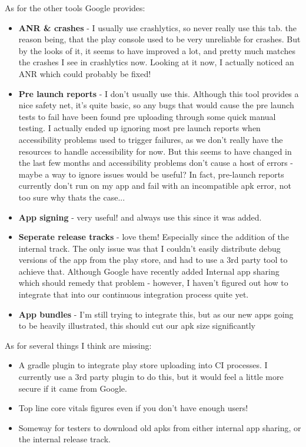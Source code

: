 As for the other tools Google provides:
\begin{itemize}
    \item \textbf{ANR \& crashes} - I usually use crashlytics, so never really use this tab. the reason being, that the play console used to be very unreliable for crashes. But by the looks of it, it seems to have improved a lot, and pretty much matches the crashes I see in crashlytics now. Looking at it now, I actually noticed an ANR which could probably be fixed!
    \item \textbf{Pre launch reports} - I don't usually use this. Although this tool provides a nice safety net, it's quite basic, so any bugs that would cause the pre launch tests to fail have been found pre uploading through some quick manual testing. I actually ended up ignoring most pre launch reports when accessibility problems used to trigger failures, as we don't really have the resources to handle accessibility for now. But this seems to have changed in the last few months and accessibility problems don't cause a host of errors - maybe a way to ignore issues would be useful? In fact, pre-launch reports currently don't run on my app and fail with an incompatible apk error, not too sure why thats the case...
    \item \textbf{App signing} - very useful! and always use this since it was added.
    \item \textbf{Seperate release tracks} - love them! Especially since the addition of the internal track. The only issue was that I couldn't easily distribute debug versions of the app from the play store, and had to use a 3rd party tool to achieve that. Although Google have recently added Internal app sharing which should remedy that problem - however, I haven't figured out how to integrate that into our continuous integration process quite yet.
    \item \textbf{App bundles} - I'm still trying to integrate this, but as our new apps going to be heavily illustrated, this should cut our apk size significantly
\end{itemize}

As for several things I think are missing:

\begin{itemize}
    \item A gradle plugin to integrate play store uploading into CI processes. I currently use a 3rd party plugin to do this, but it would feel a little more secure if it came from Google.
    \item Top line core vitals figures even if you don't have enough users!
    \item Someway for testers to download old apks from either internal app sharing, or the internal release track.
\end{itemize}

